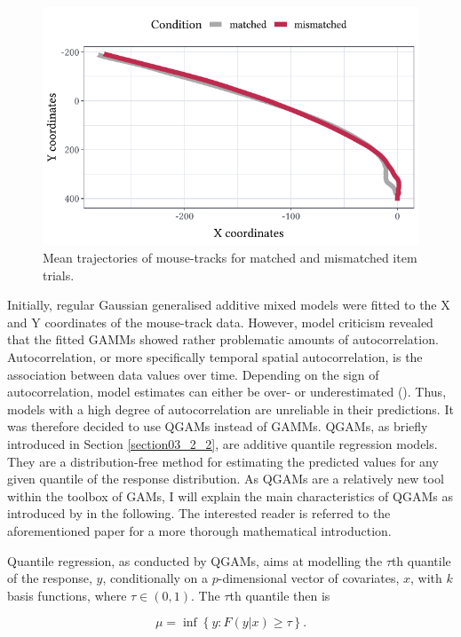 \begin{figure}
    \centering
    \includegraphics[]{figures/fig7.8.pdf}
    \caption{Mean trajectories of mouse-tracks for matched and mismatched item trials.}
    \label{fig:7_8}
\end{figure}

Initially, regular Gaussian generalised additive mixed models were fitted to the X and Y coordinates of the mouse-track data. However, model criticism revealed that the fitted GAMMs showed rather problematic amounts of autocorrelation. Autocorrelation, or more specifically temporal spatial autocorrelation, is the association between data values over time. Depending on the sign of autocorrelation, model estimates can either be over- or underestimated (\cite{Charlton2009}). Thus, models with a high degree of autocorrelation are unreliable in their predictions. It was therefore decided to use QGAMs instead of GAMMs. QGAMs, as briefly introduced in Section \ref{section03_2_2}, are additive quantile regression models. They are a distribution-free method for estimating the predicted values for any given quantile of the response distribution. As QGAMs are a relatively new tool within the toolbox of GAMs, I will explain the main characteristics of QGAMs as introduced by \citet{Fasiolo2021} in the following. The interested reader is referred to the aforementioned paper for a more thorough mathematical introduction. 

Quantile regression, as conducted by QGAMs, aims at modelling the $\tau$th quantile of the response, $y$, conditionally on a $p$-dimensional vector of covariates, $x$, with $k$ basis functions, where $\tau \in (0,1)$. The $\tau$th quantile then is 

\begin{equation}
\label{eq:mu}
    \mu=\inf \left \{ y:F(y|x)\geq \tau \right \}.
\end{equation}

